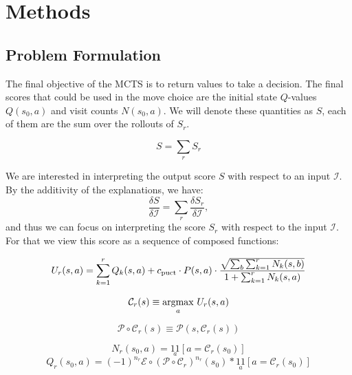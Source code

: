 \section{Methods}

\subsection{Problem Formulation}

The final objective of the MCTS is to return values to take a decision. The final scores that could be used in the move choice are the initial state $Q$-values $Q(s_0, a)$ and visit counts $N(s_0, a)$. We will denote these quantities as $S$, each of them are the sum over the rollouts of $S_r$.

\begin{equation}
    S = \sum_{r} S_r
\end{equation}

We are interested in interpreting the output score $S$ with respect to an input $\mathcal{I}$. By the additivity of the explanations, we have:
\begin{equation}
    \frac{\delta S}{\delta \mathcal{I}} = \sum_{r} \frac{\delta S_r}{\delta\mathcal{I}},
\end{equation}
 and thus we can focus on interpreting the score $S_r$ with respect to the input $\mathcal{I}$. For that we view this score as a sequence of composed functions:

\begin{equation}
    U_r(s,a)=\sum_{k=1}^r Q_k(s,a)+c_{\rm puct}\cdot P(s,a) \cdot \dfrac{\sqrt{\sum_b \sum_{k=1}^r N_k(s,b)}}{1+\sum_{k=1}^r N_k(s,a)}
\end{equation}

 \begin{equation}
    \mathcal{C}_r(s) \equiv \underset{a}{\rm argmax}~ U_r(s, a)
 \end{equation}


 \begin{equation}
    \mathcal{P}\circ \mathcal{C}_r(s) \equiv \mathcal{P}(s, \mathcal{C}_r(s))
 \end{equation}

 \begin{equation}
    N_r(s_0, a) = \underset{a}{1\!\!1} \left[a = \mathcal{C}_r(s_0)\right]
 \end{equation}
 \begin{equation}
    Q_r(s_0, a) = (-1)^{n_r} \mathcal{E}\circ\left(\mathcal{P}\circ \mathcal{C}_r\right)^{n_r}(s_0) * \underset{a}{1\!\!1} \left[a = \mathcal{C}_r(s_0)\right]
 \end{equation}

